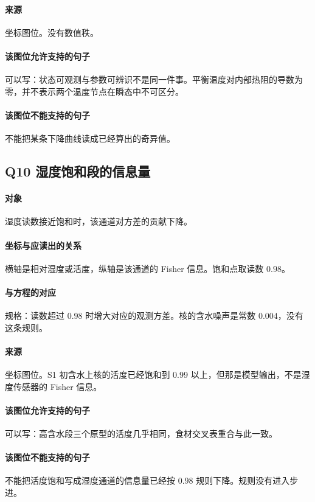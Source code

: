 \paragraph{来源}
坐标图位。没有数值秩。

\paragraph{该图位允许支持的句子}
可以写：状态可观测与参数可辨识不是同一件事。平衡温度对内部热阻的导数为零，并不表示两个温度节点在瞬态中不可区分。

\paragraph{该图位不能支持的句子}
不能把某条下降曲线读成已经算出的奇异值。

\subsection{Q10 湿度饱和段的信息量}
\paragraph{对象}
湿度读数接近饱和时，该通道对方差的贡献下降。

\paragraph{坐标与应读出的关系}
横轴是相对湿度或活度，纵轴是该通道的 Fisher 信息。饱和点取读数 $0.98$。

\paragraph{与方程的对应}
规格：读数超过 $0.98$ 时增大对应的观测方差。核的含水噪声是常数 $0.004$，没有这条规则。

\paragraph{来源}
坐标图位。S1 初含水上核的活度已经饱和到 $0.99$ 以上，但那是模型输出，不是湿度传感器的 Fisher 信息。

\paragraph{该图位允许支持的句子}
可以写：高含水段三个原型的活度几乎相同，食材交叉表重合与此一致。

\paragraph{该图位不能支持的句子}
不能把活度饱和写成湿度通道的信息量已经按 $0.98$ 规则下降。规则没有进入步进。


